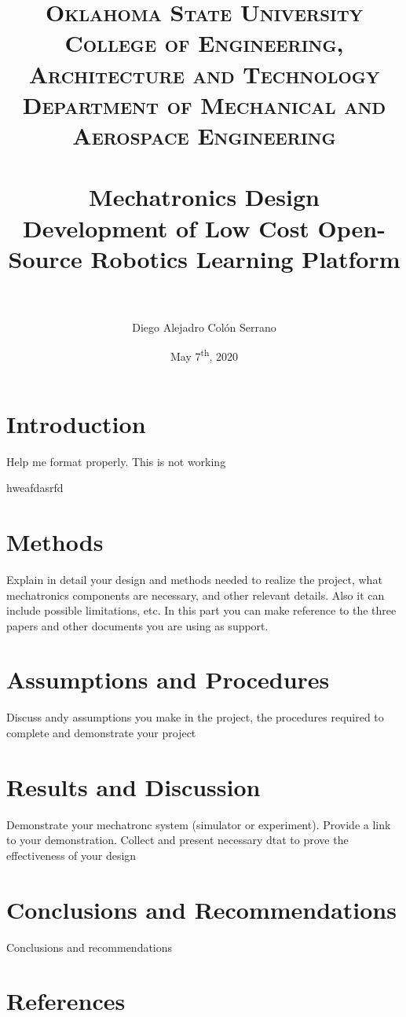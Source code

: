 \documentclass[12pt, letterpaper,titlepage]{article}
\title{	
\normalfont \normalsize 
\textsc{Oklahoma State University} \\ [25pt] 
\textsc{College of Engineering, Architecture and Technology} \\ [25pt]
\textsc{Department of Mechanical and Aerospace Engineering} \\ [25pt]
\horrule{0.5pt} \\[0.4cm] %
\huge  Mechatronics Design \\ 
\huge  Development of Low Cost Open-Source Robotics Learning Platform\\
\horrule{0.5pt} \\[0.5cm] %
}
\author{Diego Alejadro Colón Serrano}
\date{May 7\textsuperscript{th}, 2020}
\begin{document}
\maketitle
\tableofcontents
\pagebreak

\section{Introduction}
	\begin{flushleft}
		\indent
		Help me format properly.
		This is not working \par hweafdasrfd
	\end{flushleft}


\section{Methods}
	
	Explain in detail your design and methods needed to realize the project, what mechatronics components are necessary, and other relevant details. Also it can include possible limitations, etc. In this part you can make reference to the three papers and other documents you are using as support.

\section{Assumptions and Procedures}
	Discuss andy assumptions you make in the project, the procedures required to complete and demonstrate your project

\section{Results and Discussion}
	Demonstrate your mechatronc system (simulator or experiment). Provide a link to your demonstration. Collect and present necessary dtat to prove the effectiveness of your design

\section{Conclusions and Recommendations}
	Conclusions and recommendations

\section{References}
\end{document}
